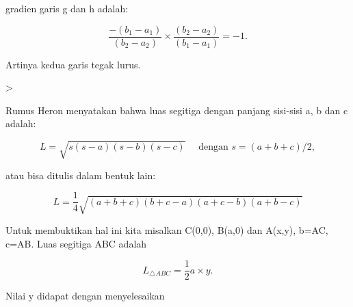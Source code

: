 \documentclass[a4paper,10pt]{article}
\begin{document}
\begin{eulernotebook}
\begin{eulercomment}
\begin{eulercomment}
\begin{eulercomment}
\begin{eulercomment}
\begin{eulercomment}
\begin{eulercomment}
\begin{eulercomment}
\begin{eulercomment}
\begin{eulercomment}
\begin{eulercomment}
\begin{eulercomment}
\begin{eulercomment}
\begin{eulercomment}
\begin{eulercomment}
\begin{eulercomment}
\begin{eulercomment}
\begin{eulercomment}
\begin{eulercomment}
\begin{eulercomment}
\begin{eulercomment}
\begin{eulercomment}
\begin{eulercomment}
\begin{eulercomment}
\begin{eulercomment}
\begin{eulercomment}
\begin{eulercomment}
\begin{eulercomment}
\begin{eulercomment}
\begin{eulercomment}
\begin{eulercomment}
\begin{eulercomment}
\begin{eulercomment}
\begin{eulercomment}
\begin{eulercomment}
\begin{eulercomment}
\begin{eulercomment}
\begin{eulercomment}
\begin{eulercomment}
\begin{eulercomment}
\begin{eulercomment}
\begin{eulercomment}
\begin{eulercomment}
\begin{eulercomment}
\begin{eulercomment}
\begin{eulercomment}
\begin{eulercomment}
\begin{eulercomment}
\begin{eulercomment}
\begin{eulercomment}
\begin{eulercomment}
\begin{eulercomment}
\begin{eulercomment}
\begin{eulercomment}
\begin{eulercomment}
\begin{eulercomment}
\begin{eulercomment}
\begin{eulercomment}
\begin{eulercomment}
\begin{eulercomment}
\begin{eulercomment}
\begin{eulercomment}
\begin{eulercomment}
\begin{eulercomment}
gradien garis g dan h adalah:

\end{eulercomment}
\begin{eulerformula}
\[
\frac{-(b_1-a_1)}{(b_2-a_2)}\times \frac{(b_2-a_2)}{(b_1-a_1)} = -1.
\]
\end{eulerformula}
\begin{eulercomment}
Artinya kedua garis tegak lurus.
\end{eulercomment}
\begin{eulerprompt}
> 
\end{eulerprompt}
\begin{eulercomment}
Rumus Heron menyatakan bahwa luas segitiga dengan panjang sisi-sisi a,
b dan c adalah:

\end{eulercomment}
\begin{eulerformula}
\[
L = \sqrt{s(s-a)(s-b)(s-c)}\quad \text{ dengan } s=(a+b+c)/2,
\]
\end{eulerformula}
\begin{eulercomment}
atau bisa ditulis dalam bentuk lain:

\end{eulercomment}
\begin{eulerformula}
\[
L = \frac{1}{4}\sqrt{(a+b+c)(b+c-a)(a+c-b)(a+b-c)}
\]
\end{eulerformula}
\begin{eulercomment}
Untuk membuktikan hal ini kita misalkan C(0,0), B(a,0) dan A(x,y),
b=AC, c=AB. Luas segitiga ABC adalah

\end{eulercomment}
\begin{eulerformula}
\[
L_{\triangle ABC}=\frac{1}{2}a\times y.
\]
\end{eulerformula}
\begin{eulercomment}
Nilai y didapat dengan menyelesaikan 
\end{eulercomment}
\end{eulercomment}
\end{eulercomment}
\end{eulercomment}
\end{eulercomment}
\end{eulercomment}
\end{eulercomment}
\end{eulercomment}
\end{eulercomment}
\end{eulercomment}
\end{eulercomment}
\end{eulercomment}
\end{eulercomment}
\end{eulercomment}
\end{eulercomment}
\end{eulercomment}
\end{eulercomment}
\end{eulercomment}
\end{eulercomment}
\end{eulercomment}
\end{eulercomment}
\end{eulercomment}
\end{eulercomment}
\end{eulercomment}
\end{eulercomment}
\end{eulercomment}
\end{eulercomment}
\end{eulercomment}
\end{eulercomment}
\end{eulercomment}
\end{eulercomment}
\end{eulercomment}
\end{eulercomment}
\end{eulercomment}
\end{eulercomment}
\end{eulercomment}
\end{eulercomment}
\end{eulercomment}
\end{eulercomment}
\end{eulercomment}
\end{eulercomment}
\end{eulercomment}
\end{eulercomment}
\end{eulercomment}
\end{eulercomment}
\end{eulercomment}
\end{eulercomment}
\end{eulercomment}
\end{eulercomment}
\end{eulercomment}
\end{eulercomment}
\end{eulercomment}
\end{eulercomment}
\end{eulercomment}
\end{eulercomment}
\end{eulercomment}
\end{eulercomment}
\end{eulercomment}
\end{eulercomment}
\end{eulercomment}
\end{eulercomment}
\end{eulercomment}
\end{eulercomment}
\end{eulernotebook}
\end{document}
